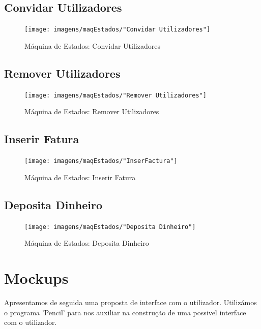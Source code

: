 \subsection{Convidar Utilizadores}
\begin{figure}[htb!]
	\centering
	\texttt{[image: imagens/maqEstados/"Convidar Utilizadores"]}  
	\caption{Máquina de Estados: Convidar Utilizadores}  
\end{figure}

\newpage

\subsection{Remover Utilizadores}
\begin{figure}[htb!]
	\centering
	\texttt{[image: imagens/maqEstados/"Remover Utilizadores"]}  
	\caption{Máquina de Estados: Remover Utilizadores}  
\end{figure}

\subsection{Inserir Fatura}
\begin{figure}[htb!]
	\centering
	\texttt{[image: imagens/maqEstados/"InserFactura"]}  
	\caption{Máquina de Estados: Inserir Fatura}  
\end{figure}

\subsection{Deposita Dinheiro}
\begin{figure}[htb!]
	\centering
	\texttt{[image: imagens/maqEstados/"Deposita Dinheiro"]}  
	\caption{Máquina de Estados: Deposita Dinheiro}  
\end{figure}

\newpage
\section{Mockups}
Apresentamos de seguida uma proposta de interface com o utilizador. Utilizámos o programa 'Pencil' para nos auxiliar na construção de uma possivel interface com o utilizador. 


